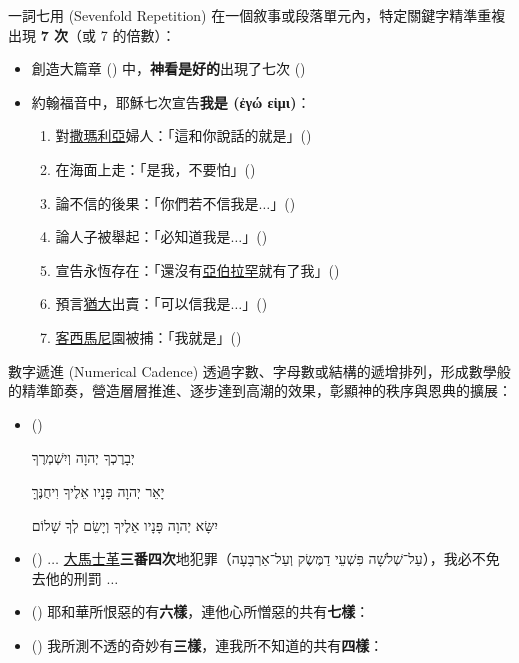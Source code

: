 \documentclass{beamer}
\begin{document}
\begin{frame}{一詞七用 (Sevenfold Repetition)}
  在一個敘事或段落單元內，特定關鍵字精準重複出現 \textbf{7 次}（或 7 的倍數）：
  \begin{itemize}
    \item 創造大篇章 () 中，\textbf{神看是好的}出現了七次 ()
    \item 約翰福音中，耶穌七次宣告\textbf{我是 (\textgreek{ἐγώ εἰμι})}\parencite{IAmInJohn}：
      \begin{enumerate}
        \item 對\uline{撒瑪利亞}婦人：「這和你說話的就是」()
        \item 在海面上走：「是我，不要怕」()
        \item 論不信的後果：「你們若不信我是$\dots$」()
        \item 論人子被舉起：「必知道我是$\dots$」()
        \item 宣告永恆存在：「還沒有\uline{亞伯拉罕}就有了我」()
        \item 預言\uline{猶大}出賣：「可以信我是$\dots$」()
        \item \uline{客西馬尼}園被捕：「我就是」()
      \end{enumerate}
  \end{itemize}
\end{frame}

\begin{frame}{數字遞進 (Numerical Cadence)}
  透過字數、字母數或結構的遞增排列，形成數學般的精準節奏，營造層層推進、逐步達到高潮的效果，彰顯神的秩序與恩典的擴展：
  \begin{itemize}
    \item ()\\
      \begin{hebrew}
        יְבָרֶכְךָ יְהוָה וְיִשְׁמְרֶךָ\par
        יָאֵר יְהוָה פָּנָיו אֵלֶיךָ וִיחֻנֶּךָּ\par
        יִשָּׂא יְהוָה פָּנָיו אֵלֶיךָ וְיָשֵׂם לְךָ שָׁלוֹם\par
      \end{hebrew}
    \item () $\dots$ \uline{大馬士革}\textbf{三番四次}地犯罪（\texthebrew{עַל־שְׁלֹשָׁה פִּשְׁעֵי דַמֶּשֶׂק וְעַל־אַרְבָּעָה}），我必不免去他的刑罰 $\dots$
    \item () 耶和華所恨惡的有\textbf{六樣}，連他心所憎惡的共有\textbf{七樣}：
    \item () 我所測不透的奇妙有\textbf{三樣}，連我所不知道的共有\textbf{四樣}：
  \end{itemize}
\end{frame}
\end{document}
